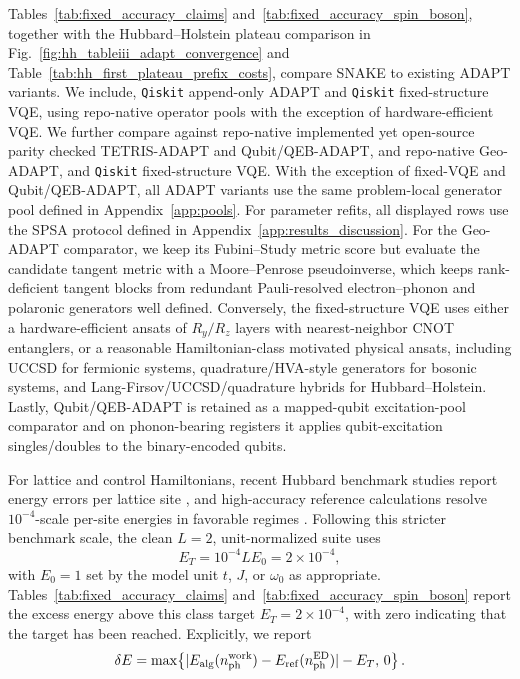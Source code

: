 \documentclass[
  reprint,
  amsmath,
  amssymb,
  aps,
  pra,
  nofootinbib,
  superscriptaddress,
  floatfix
]{revtex4-2}
\begin{document}
Tables~\ref{tab:fixed_accuracy_claims} and~\ref{tab:fixed_accuracy_spin_boson}, together with the Hubbard--Holstein plateau comparison in Fig.~\ref{fig:hh_tableiii_adapt_convergence} and Table~\ref{tab:hh_first_plateau_prefix_costs}, compare SNAKE to existing ADAPT variants. We include, \texttt{Qiskit} append-only ADAPT and \texttt{Qiskit} fixed-structure VQE, using repo-native operator pools with the exception of hardware-efficient VQE. We further compare against repo-native implemented yet open-source parity checked TETRIS-ADAPT and Qubit/QEB-ADAPT, and repo-native Geo-ADAPT, and \texttt{Qiskit} fixed-structure VQE. With the exception of fixed-VQE and Qubit/QEB-ADAPT, all ADAPT variants use the same problem-local
generator pool defined in Appendix~\ref{app:pools}. For parameter refits, all displayed rows use the SPSA protocol defined in Appendix~\ref{app:results_discussion}. For the Geo-ADAPT comparator, we keep its Fubini--Study metric score but evaluate the candidate tangent metric with a Moore--Penrose pseudoinverse, which keeps rank-deficient tangent blocks from redundant Pauli-resolved electron--phonon and polaronic generators well defined. Conversely, the fixed-structure VQE uses either a hardware-efficient ansats of \(R_y/R_z\) layers with nearest-neighbor CNOT entanglers, or a reasonable Hamiltonian-class motivated physical ansats, including UCCSD for fermionic systems, quadrature/HVA-style generators for bosonic
systems, and Lang-Firsov/UCCSD/quadrature hybrids for Hubbard--Holstein.  Lastly, Qubit/QEB-ADAPT is retained as a mapped-qubit excitation-pool comparator and on phonon-bearing
registers it applies qubit-excitation singles/doubles to the
binary-encoded qubits. 

For lattice and control Hamiltonians, recent Hubbard benchmark studies
report energy errors per lattice site \cite{Alvertis2024HubbardVQE},
and high-accuracy reference calculations resolve \(10^{-4}\)-scale
per-site energies in favorable regimes
\cite{LeBlanc2015HubbardBenchmarks,Qin2016AFQMCHubbard}. Following
this stricter benchmark scale, the clean \(L=2\),
unit-normalized suite uses
\[
E_T=10^{-4}LE_0=2\times10^{-4},
\]
with \(E_0=1\) set by the model unit \(t\), \(J\), or \(\omega_0\) as
appropriate.  
Tables~\ref{tab:fixed_accuracy_claims} and~\ref{tab:fixed_accuracy_spin_boson} report the excess energy above this class target \(E_T=2\times 10^{-4}\), with zero indicating that the target has been reached.  Explicitly, we report
\[
\delta E=\max\!\left\{|E_{\rm alg}(n_{\rm ph}^{\rm work})-E_{\rm ref}(n_{\rm ph}^{\rm ED})|-E_T,\,0\right\}.
\]
\end{document}

